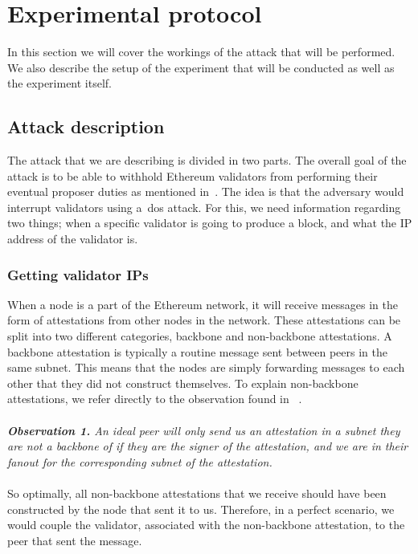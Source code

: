 

\section{Experimental protocol}\label{sec:experimental-protocol}
In this section we will cover the workings of the attack that will be performed.
We also describe the setup of the experiment that will be conducted as well as the experiment itself.

\subsection{Attack description}\label{subsec:attack-description}
The attack that we are describing is divided in two parts.
The overall goal of the attack is
to be able
to withhold Ethereum validators from performing their eventual proposer duties
as mentioned in~\cite{EthereumAttackDefense2024}.
The idea is that the adversary would interrupt validators using a~\gls{dos} attack.
For this, we need information regarding two things;
when a specific validator is going to produce a block, and what the IP address of the validator is.

\subsubsection{Getting validator IPs}
When a node is a part of the Ethereum network,
it will receive messages in the form of attestations from other nodes in the network.
These attestations can be split into two different categories, backbone and non-backbone attestations.
A backbone attestation is typically a routine message sent between peers in the same subnet.
This means that the nodes are simply forwarding messages to each other that they did not construct themselves.
To explain non-backbone attestations,
we refer directly to the observation found in ~\cite{heimbach2024deanonymizingethereumvalidatorsp2p}.
\\\\
\textit{\textbf{Observation 1.} An ideal peer will only send us an attestation in a subnet they are not a backbone of
if they are the signer of the attestation,
    and we are in their fanout for the corresponding subnet of the attestation.}
\\\\

So optimally, all non-backbone attestations that we receive should have been constructed by the node that sent it to us.
Therefore, in a perfect scenario,
we would couple the validator, associated with the non-backbone attestation, to the peer that sent the message.

